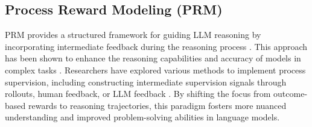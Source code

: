 \subsection{Process Reward Modeling (PRM)}

PRM provides a structured framework for guiding LLM reasoning by incorporating intermediate feedback during the reasoning process \citep{lightman2023let,ma2023let}. This approach has been shown to enhance the reasoning capabilities and accuracy of models in complex tasks \citep{setlur2024rewarding,wu2024inference}. Researchers have explored various methods to implement process supervision, including constructing intermediate supervision signals through rollouts, human feedback, or LLM feedback \citep{zhang2024rest,cobbe2021training,wang2024math,sun2024large}. By shifting the focus from outcome-based rewards to reasoning trajectories, this paradigm fosters more nuanced understanding and improved problem-solving abilities in language models.